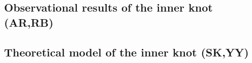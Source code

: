 \subsection{Observational results of the inner knot (AR,RB)}
\label{sec:knot}
\cite{Moran_2015}\cite{rudy2015}\cite{Madsen_2015}

\subsection{Theoretical model of the inner knot (SK,YY)}
